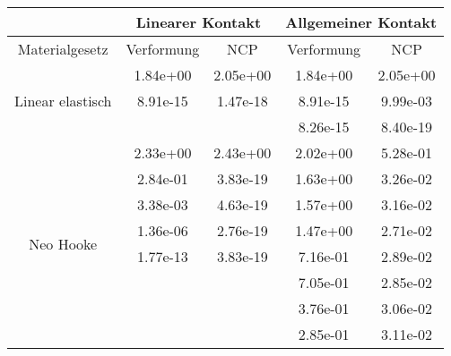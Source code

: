 \begin{table} 
\centering 
\begin{tabular}{c|cc|cc|} 
\cline{2-5} 
 & \multicolumn{2}{|c|}{Linearer Kontakt} & \multicolumn{2}{|c|}{Allgemeiner Kontakt} \\ 
\hline 
\multicolumn{1}{|c|}{Materialgesetz} & \multicolumn{1}{c|}{Verformung} & \multicolumn{1}{c|}{NCP} & \multicolumn{1}{c|}{Verformung} & \multicolumn{1}{c|}{NCP} \\ 
\hline 
\multicolumn{1}{|c|}{\multirow{3}{*}{Linear elastisch}} &\multicolumn{1}{|c|}{  1.84e+00} & \multicolumn{1}{|c|}{  2.05e+00} & \multicolumn{1}{|c|}{  1.84e+00} & \multicolumn{1}{|c|}{  2.05e+00} \\ 
\multicolumn{1}{|c|}{} & \multicolumn{1}{|c|}{  8.91e-15} & \multicolumn{1}{|c|}{  1.47e-18} & \multicolumn{1}{|c|}{  8.91e-15} & \multicolumn{1}{|c|}{  9.99e-03} \\ 
\multicolumn{1}{|c|}{} & \multicolumn{1}{|c|}{} & \multicolumn{1}{|c|}{} & \multicolumn{1}{|c|}{  8.26e-15} & \multicolumn{1}{|c|}{  8.40e-19} \\ 
\hline 
\multicolumn{1}{|c|}{\multirow{15}{*}{Neo Hooke}} &\multicolumn{1}{|c|}{  2.33e+00} & \multicolumn{1}{|c|}{  2.43e+00} & \multicolumn{1}{|c|}{  2.02e+00} & \multicolumn{1}{|c|}{  5.28e-01} \\ 
\multicolumn{1}{|c|}{} & \multicolumn{1}{|c|}{  2.84e-01} & \multicolumn{1}{|c|}{  3.83e-19} & \multicolumn{1}{|c|}{  1.63e+00} & \multicolumn{1}{|c|}{  3.26e-02} \\ 
\multicolumn{1}{|c|}{} & \multicolumn{1}{|c|}{  3.38e-03} & \multicolumn{1}{|c|}{  4.63e-19} & \multicolumn{1}{|c|}{  1.57e+00} & \multicolumn{1}{|c|}{  3.16e-02} \\ 
\multicolumn{1}{|c|}{} & \multicolumn{1}{|c|}{  1.36e-06} & \multicolumn{1}{|c|}{  2.76e-19} & \multicolumn{1}{|c|}{  1.47e+00} & \multicolumn{1}{|c|}{  2.71e-02} \\ 
\multicolumn{1}{|c|}{} & \multicolumn{1}{|c|}{  1.77e-13} & \multicolumn{1}{|c|}{  3.83e-19} & \multicolumn{1}{|c|}{  7.16e-01} & \multicolumn{1}{|c|}{  2.89e-02} \\ 
\multicolumn{1}{|c|}{} & \multicolumn{1}{|c|}{} & \multicolumn{1}{|c|}{} & \multicolumn{1}{|c|}{  7.05e-01} & \multicolumn{1}{|c|}{  2.85e-02} \\ 
\multicolumn{1}{|c|}{} & \multicolumn{1}{|c|}{} & \multicolumn{1}{|c|}{} & \multicolumn{1}{|c|}{  3.76e-01} & \multicolumn{1}{|c|}{  3.06e-02} \\ 
\multicolumn{1}{|c|}{} & \multicolumn{1}{|c|}{} & \multicolumn{1}{|c|}{} & \multicolumn{1}{|c|}{  2.85e-01} & \multicolumn{1}{|c|}{  3.11e-02} \\ 

\end{tabular}
\end{table}
